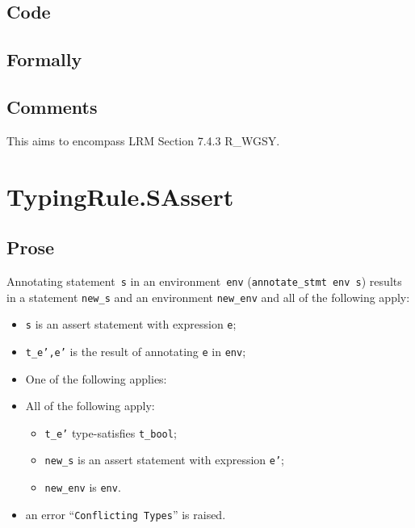 \documentclass{book}
\begin{document}
  \subsection{Code}

\begin{emptyformal}
    \subsection{Formally}
\end{emptyformal}

\subsection{Comments}
    This aims to encompass LRM Section 7.4.3 R\_WGSY.

\section{TypingRule.SAssert \label{sec:TypingRule.SAssert}}

  \subsection{Prose}
Annotating statement~\texttt{s} in an environment~\texttt{env}
(\texttt{annotate\_stmt env s}) results in a statement \texttt{new\_s} and an
environment \texttt{new\_env} and all of the following apply:
   \begin{itemize}
   \item \texttt{s} is an assert statement with expression \texttt{e};
   \item \texttt{t\_e',e'} is the result of annotating \texttt{e} in \texttt{env};
   \item One of the following applies:
     \item All of the following apply:
       \begin{itemize}
       \item \texttt{t\_e'} type-satisfies \texttt{t\_bool};
       \item \texttt{new\_s} is an assert statement with expression \texttt{e'};
       \item \texttt{new\_env} is \texttt{env}.
       \end{itemize}
     \item an error ``\texttt{Conflicting Types}'' is raised.
   \end{itemize}
\end{document}
